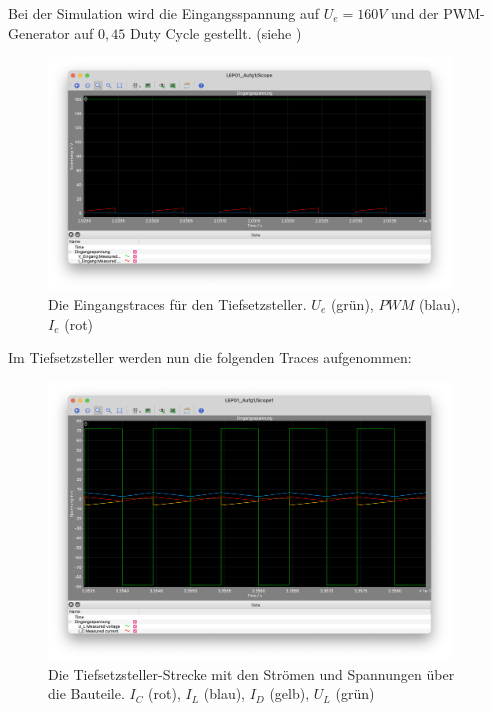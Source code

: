 \documentclass{report}
\begin{document}
Bei der Simulation wird die Eingangsspannung auf $U_e = 160V$ und der PWM-Generator auf $0,45$ Duty Cycle gestellt. (siehe )

\begin{figure}
  \begin{center}
    \includegraphics[width=0.95\textwidth]{./assets/img/aufg1_eingang.png}
  \end{center}
  \caption{Die Eingangstraces für den Tiefsetzsteller. $U_e$ (grün), $PWM$ (blau), $I_e$ (rot)}
  \label{fig:aufg1_eingang}
\end{figure}

Im Tiefsetzsteller werden nun die folgenden Traces aufgenommen:

\begin{figure}
  \begin{center}
    \includegraphics[width=0.95\textwidth]{assets/img/aufg1_strecke.png}
  \end{center}
  \caption{Die Tiefsetzsteller-Strecke mit den Strömen und Spannungen über die Bauteile. $I_C$ (rot), $I_L$ (blau), $I_D$ (gelb), $U_L$ (grün)}
  \label{fig:aufg1_strecke}
\end{figure}
\end{document}
